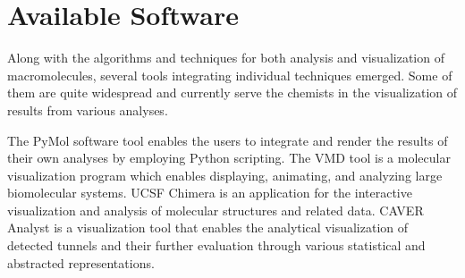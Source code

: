 \section{Available Software}
Along with the algorithms and techniques for both analysis and visualization of macromolecules, several tools integrating individual techniques emerged. Some of them are quite widespread and currently serve the chemists in the visualization of results from various analyses.

The PyMol software tool \cite{delano2002pymol} enables the users to integrate and render the results of their own analyses by employing Python scripting. The VMD tool \cite{humphrey1996vmd} is a molecular visualization program which enables displaying, animating, and analyzing large biomolecular systems. UCSF Chimera \cite{pettersen2004ucsf} is an application for the interactive visualization and analysis of molecular structures and related data. CAVER Analyst is a visualization tool \cite{kozlikova2014caver} that enables the analytical visualization of detected tunnels and their further evaluation through various statistical and abstracted representations.






